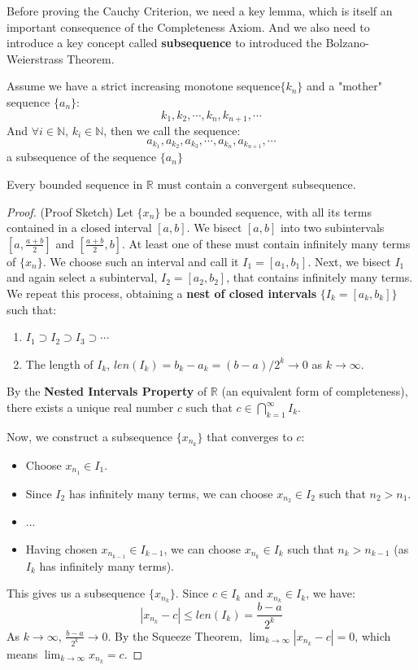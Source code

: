 Before proving the Cauchy Criterion, we need a key lemma, which is itself an important consequence of the Completeness Axiom. And we also need to introduce a key concept called \textbf{subsequence} to introduced the Bolzano- Weierstrass Theorem.

\begin{definition}[Subsequence]
    Assume we have a strict increasing monotone sequence$\{k_n\}$ and a "mother" sequence $\{a_n\}$:
    \[
    k_1, k_2, \cdots, k_n, k_{n+1}, \cdots
    \]
    And $\forall i \in \mathbb{N}$, $k_i \in \mathbb{N}$, then we call the sequence:
    \[
    a_{k_1}, a_{k_2}, a_{k_3}, \cdots , a_{k_n}, a_{k_{n+1}}, \cdots
    \]
    a subsequence of the sequence $\{a_n\}$
\end{definition}

\begin{theorem}
\label{thm:bw_en}
Every bounded sequence in $\mathbb{R}$ must contain a convergent subsequence.
\end{theorem}

\begin{proof}
(Proof Sketch) Let $\{x_n\}$ be a bounded sequence, with all its terms contained in a closed interval $[a, b]$.
We bisect $[a, b]$ into two subintervals $[a, \frac{a+b}{2}]$ and $[\frac{a+b}{2}, b]$. At least one of these must contain infinitely many terms of $\{x_n\}$. We choose such an interval and call it $I_1 = [a_1, b_1]$.
Next, we bisect $I_1$ and again select a subinterval, $I_2 = [a_2, b_2]$, that contains infinitely many terms.
We repeat this process, obtaining a \textbf{nest of closed intervals} $\{I_k = [a_k, b_k]\}$ such that:
\begin{enumerate}
    \item $I_1 \supset I_2 \supset I_3 \supset \cdots$
    \item The length of $I_k$, $len(I_k) = b_k - a_k = (b-a)/2^k \to 0$ as $k \to \infty$.
\end{enumerate}
By the \textbf{Nested Intervals Property} of $\mathbb{R}$ (an equivalent form of completeness), there exists a unique real number $c$ such that $c \in \bigcap_{k=1}^\infty I_k$.

Now, we construct a subsequence $\{x_{n_k}\}$ that converges to $c$:
\begin{itemize}
    \item Choose $x_{n_1} \in I_1$.
    \item Since $I_2$ has infinitely many terms, we can choose $x_{n_2} \in I_2$ such that $n_2 > n_1$.
    \item ...
    \item Having chosen $x_{n_{k-1}} \in I_{k-1}$, we can choose $x_{n_k} \in I_k$ such that $n_k > n_{k-1}$ (as $I_k$ has infinitely many terms).
\end{itemize}
This gives us a subsequence $\{x_{n_k}\}$. Since $c \in I_k$ and $x_{n_k} \in I_k$, we have:
\[
|x_{n_k} - c| \leq len(I_k) = \frac{b-a}{2^k}
\]
As $k \to \infty$, $\frac{b-a}{2^k} \to 0$. By the Squeeze Theorem, $\lim_{k \to \infty} |x_{n_k} - c| = 0$, which means $\lim_{k \to \infty} x_{n_k} = c$.
\end{proof}

